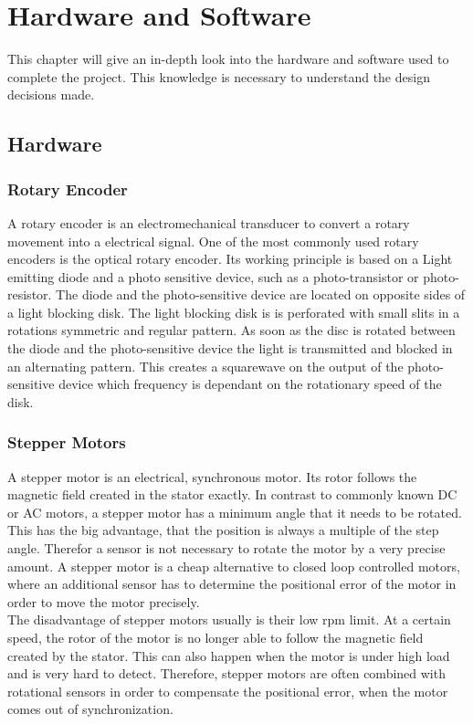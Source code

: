 \chapter{Hardware and Software}
\label{hardwareandsoftware}

This chapter will give an in-depth look into the hardware and software used to complete the project. This knowledge is necessary to understand the design decisions made.

\section{Hardware}

\subsection{Rotary Encoder}
A rotary encoder is an electromechanical transducer to convert a rotary movement into a electrical signal. One of the most commonly used rotary encoders is the optical rotary encoder.
Its working principle is based on a Light emitting diode and a photo sensitive device, such as a photo-transistor or photo-resistor. The diode and the photo-sensitive device are located on opposite sides of a light blocking disk. 
The light blocking disk is is perforated with small slits in a rotations symmetric and regular pattern. As soon as the disc is rotated between the diode and the photo-sensitive device the light is transmitted and blocked in an alternating pattern.
This creates a squarewave on the output of the photo-sensitive device which frequency is dependant on the rotationary speed of the disk.


\subsection{Stepper Motors}
A stepper motor is an electrical, synchronous motor. Its rotor follows the magnetic field created in the stator exactly. In contrast to commonly known DC or AC motors, a stepper motor has a minimum angle that it needs to be rotated. 
This has the big advantage, that the position is always a multiple of the step angle. Therefor a sensor is not necessary to rotate the motor by a very precise amount. A stepper motor is a cheap alternative to 
closed loop controlled motors, where an additional sensor has to determine the positional error of the motor in order to move the motor precisely.\\
The disadvantage of stepper motors usually is their low rpm limit. At a certain speed, the rotor of the motor is no longer able to follow the magnetic field created by the stator. 
This can also happen when the motor is under high load and is very hard to detect. Therefore, stepper motors are often combined with rotational sensors in order to compensate the positional error, when the motor comes out of synchronization.\cite{SchrittmotorenFaulhaber2022}

